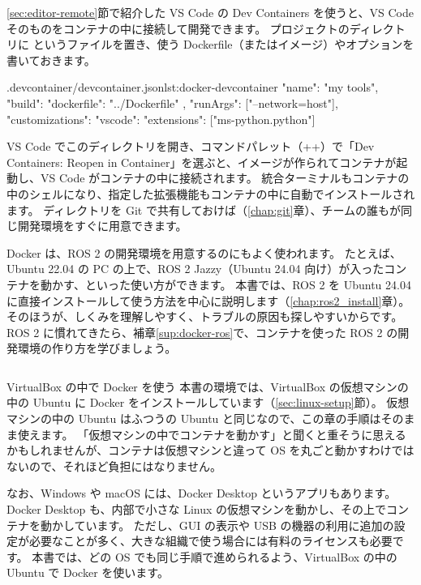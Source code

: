 \ref{sec:editor-remote}節で紹介した VS Code の Dev Containers を使うと、VS Code そのものをコンテナの中に接続して開発できます。
プロジェクトのディレクトリに  というファイルを置き、使う Dockerfile（またはイメージ）やオプションを書いておきます。

\begin{codelisting}{.devcontainer/devcontainer.json}{lst:docker-devcontainer}
{
  "name": "my tools",
  "build": { "dockerfile": "../Dockerfile" },
  "runArgs": ["--network=host"],
  "customizations": {
    "vscode": {
      "extensions": ["ms-python.python"]
    }
  }
}
\end{codelisting}

VS Code でこのディレクトリを開き、コマンドパレット（++）で「Dev Containers: Reopen in Container」を選ぶと、イメージが作られてコンテナが起動し、VS Code がコンテナの中に接続されます。
統合ターミナルもコンテナの中のシェルになり、指定した拡張機能もコンテナの中に自動でインストールされます。
 ディレクトリを Git で共有しておけば（\ref{chap:git}章）、チームの誰もが同じ開発環境をすぐに用意できます。

\begin{point}
  Docker は、ROS 2 の開発環境を用意するのにもよく使われます。
  たとえば、Ubuntu 22.04 の PC の上で、ROS 2 Jazzy（Ubuntu 24.04 向け）が入ったコンテナを動かす、といった使い方ができます。
  本書では、ROS 2 を Ubuntu 24.04 に直接インストールして使う方法を中心に説明します（\ref{chap:ros2_install}章）。
  そのほうが、しくみを理解しやすく、トラブルの原因も探しやすいからです。
  ROS 2 に慣れてきたら、補章\ref{sup:docker-ros}で、コンテナを使った ROS 2 の開発環境の作り方を学びましょう。
\end{point}

\begin{column}{VirtualBox の中で Docker を使う}
  本書の環境では、VirtualBox の仮想マシンの中の Ubuntu に Docker をインストールしています（\ref{sec:linux-setup}節）。
  仮想マシンの中の Ubuntu はふつうの Ubuntu と同じなので、この章の手順はそのまま使えます。
  「仮想マシンの中でコンテナを動かす」と聞くと重そうに思えるかもしれませんが、コンテナは仮想マシンと違って OS を丸ごと動かすわけではないので、それほど負担にはなりません。

  なお、Windows や macOS には、Docker Desktop というアプリもあります。
  Docker Desktop も、内部で小さな Linux の仮想マシンを動かし、その上でコンテナを動かしています。
  ただし、GUI の表示や USB の機器の利用に追加の設定が必要なことが多く、大きな組織で使う場合には有料のライセンスも必要です。
  本書では、どの OS でも同じ手順で進められるよう、VirtualBox の中の Ubuntu で Docker を使います。
\end{column}

